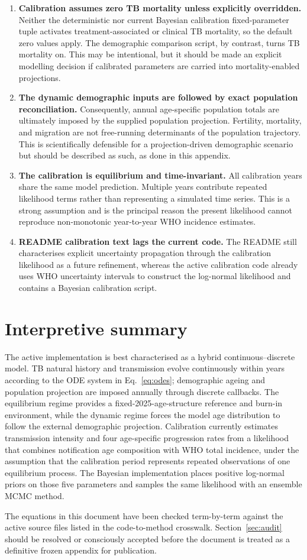 \documentclass[11pt]{article}
\begin{document}
\begin{enumerate}[leftmargin=*,label=\textbf{A\arabic*.}]
\item \textbf{Calibration assumes zero TB mortality unless explicitly overridden.} Neither the deterministic nor current Bayesian calibration fixed-parameter tuple activates treatment-associated or clinical TB mortality, so the default zero values apply. The demographic comparison script, by contrast, turns TB mortality on. This may be intentional, but it should be made an explicit modelling decision if calibrated parameters are carried into mortality-enabled projections.

\item \textbf{The dynamic demographic inputs are followed by exact population reconciliation.} Consequently, annual age-specific population totals are ultimately imposed by the supplied population projection. Fertility, mortality, and migration are not free-running determinants of the population trajectory. This is scientifically defensible for a projection-driven demographic scenario but should be described as such, as done in this appendix.

\item \textbf{The calibration is equilibrium and time-invariant.} All calibration years share the same model prediction. Multiple years contribute repeated likelihood terms rather than representing a simulated time series. This is a strong assumption and is the principal reason the present likelihood cannot reproduce non-monotonic year-to-year WHO incidence estimates.

\item \textbf{README calibration text lags the current code.} The README still characterises explicit uncertainty propagation through the calibration likelihood as a future refinement, whereas the active calibration code already uses WHO uncertainty intervals to construct the log-normal likelihood and contains a Bayesian calibration script.
\end{enumerate}

\section{Interpretive summary}

The active implementation is best characterised as a hybrid continuous--discrete model. TB natural history and transmission evolve continuously within years according to the ODE system in Eq.~\eqref{eq:odes}; demographic ageing and population projection are imposed annually through discrete callbacks. The equilibrium regime provides a fixed-2025-age-structure reference and burn-in environment, while the dynamic regime forces the model age distribution to follow the external demographic projection. Calibration currently estimates transmission intensity and four age-specific progression rates from a likelihood that combines notification age composition with WHO total incidence, under the assumption that the calibration period represents repeated observations of one equilibrium process. The Bayesian implementation places positive log-normal priors on those five parameters and samples the same likelihood with an ensemble MCMC method.

The equations in this document have been checked term-by-term against the active source files listed in the code-to-method crosswalk. Section~\ref{sec:audit} should be resolved or consciously accepted before the document is treated as a definitive frozen appendix for publication.
\end{document}
